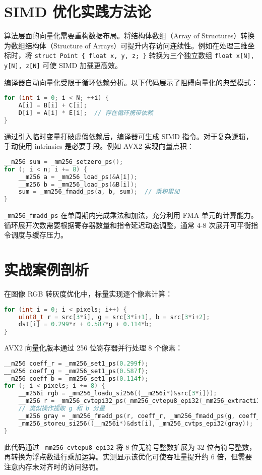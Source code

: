 \chapter{SIMD 优化实践方法论}
算法层面的向量化需要重构数据布局。将结构体数组（Array of Structures）转换为数组结构体（Structure of Arrays）可提升内存访问连续性。例如在处理三维坐标时，将 \verb!struct Point { float x, y, z; }! 转换为三个独立数组 \verb!float x[N], y[N], z[N]! 可使 SIMD 加载更高效。\par
编译器自动向量化受限于循环依赖分析。以下代码展示了阻碍向量化的典型模式：\par
\begin{lstlisting}[language=c]
for (int i = 0; i < N; ++i) {
    A[i] = B[i] + C[i];
    D[i] = A[i] * E[i];  // 存在循环携带依赖
}
\end{lstlisting}
通过引入临时变量打破虚假依赖后，编译器可生成 SIMD 指令。对于复杂逻辑，手动使用 intrinsics 是必要手段。例如 AVX2 实现向量点积：\par
\begin{lstlisting}[language=c]
__m256 sum = _mm256_setzero_ps();
for (; i < n; i += 8) {
    __m256 a = _mm256_load_ps(&A[i]);
    __m256 b = _mm256_load_ps(&B[i]);
    sum = _mm256_fmadd_ps(a, b, sum);  // 乘积累加
}
\end{lstlisting}
\verb!_mm256_fmadd_ps! 在单周期内完成乘法和加法，充分利用 FMA 单元的计算能力。循环展开次数需要根据寄存器数量和指令延迟动态调整，通常 4-8 次展开可平衡指令调度与缓存压力。\par
\chapter{实战案例剖析}
在图像 RGB 转灰度优化中，标量实现逐个像素计算：\par
\begin{lstlisting}[language=c]
for (int i = 0; i < pixels; i++) {
    uint8_t r = src[3*i], g = src[3*i+1], b = src[3*i+2];
    dst[i] = 0.299*r + 0.587*g + 0.114*b;
}
\end{lstlisting}
AVX2 向量化版本通过 256 位寄存器并行处理 8 个像素：\par
\begin{lstlisting}[language=c]
__m256 coeff_r = _mm256_set1_ps(0.299f);
__m256 coeff_g = _mm256_set1_ps(0.587f);
__m256 coeff_b = _mm256_set1_ps(0.114f);
for (; i < pixels; i += 8) {
    __m256i rgb = _mm256_loadu_si256((__m256i*)&src[3*i]));
    __m256 r = _mm256_cvtepi32_ps(_mm256_cvtepu8_epi32(_mm256_extracti128_si256(rgb, 0)));
    // 类似操作提取 g 和 b 分量
    __m256 gray = _mm256_fmadd_ps(r, coeff_r, _mm256_fmadd_ps(g, coeff_g, _mm256_mul_ps(b, coeff_b)));
    _mm256_storeu_si256((__m256i*)&dst[i], _mm256_cvtps_epi32(gray));
}
\end{lstlisting}
此代码通过 \verb!_mm256_cvtepu8_epi32! 将 8 位无符号整数扩展为 32 位有符号整数，再转换为浮点数进行乘加运算。实测显示该优化可使吞吐量提升约 6 倍，但需要注意内存未对齐时的访问惩罚。\par
